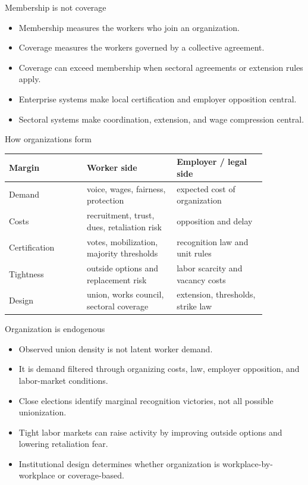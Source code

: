 \documentclass[aspectratio=169,11pt]{beamer}
\begin{document}
\begin{frame}{Membership is not coverage}
\begin{itemize}
    \item Membership measures the workers who join an organization.
    \item Coverage measures the workers governed by a collective agreement.
    \item Coverage can exceed membership when sectoral agreements or extension rules apply.
    \item Enterprise systems make local certification and employer opposition central.
    \item Sectoral systems make coordination, extension, and wage compression central.
\end{itemize}
\end{frame}

\begin{frame}{How organizations form}
\small
\begin{tabular}{p{0.26\linewidth} p{0.30\linewidth} p{0.30\linewidth}}
\toprule
Margin & Worker side & Employer / legal side \\
\midrule
Demand & voice, wages, fairness, protection & expected cost of organization \\
Costs & recruitment, trust, dues, retaliation risk & opposition and delay \\
Certification & votes, mobilization, majority thresholds & recognition law and unit rules \\
Tightness & outside options and replacement risk & labor scarcity and vacancy costs \\
Design & union, works council, sectoral coverage & extension, thresholds, strike law \\
\bottomrule
\end{tabular}
\end{frame}

\begin{frame}{Organization is endogenous}
\begin{itemize}
    \item Observed union density is not latent worker demand.
    \item It is demand filtered through organizing costs, law, employer opposition, and labor-market conditions.
    \item Close elections identify marginal recognition victories, not all possible unionization.
    \item Tight labor markets can raise activity by improving outside options and lowering retaliation fear.
    \item Institutional design determines whether organization is workplace-by-workplace or coverage-based.
\end{itemize}
\end{frame}
\end{document}
